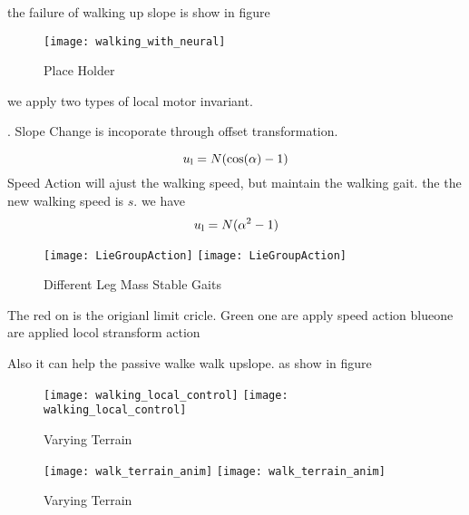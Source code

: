 the failure of walking up slope is show in figure

\begin{figure}[!htbp]
  \begin{center}
      \texttt{[image: walking\_with\_neural]}
    \caption{Place Holder}
    \label{fig:withoutlocalcontroller}
\end{center}
\end{figure}

we apply two types of local motor invariant.
\begin{itemize}

.
Slope Change is incoporate through offset transformation.

\[
u_{\mathrm{l}}=N(\mathrm{cos}(\alpha)-1)
\]
Speed Action will ajust the walking speed, but maintain the walking gait.
the the new walking speed is $s$.
we have
\[  
u_{\mathrm{l}}=N(\alpha^2-1)
\]
\end{itemize}

\begin{figure}[!htbp]
  \begin{center}
    \leavevmode
    \ifpdf
      \texttt{[image: LieGroupAction]}
    \else
      \texttt{[image: LieGroupAction]}
    \fi
    \caption{Different Leg Mass Stable Gaits}
    \label{fig:differentlr}
\end{center}
\end{figure}

The red on is the origianl limit cricle.
Green one are apply speed action
blueone are applied  locol stransform action

Also it can help the passive walke walk upslope.
as show in figure


\begin{figure}[!htbp]
  \begin{center}
    \leavevmode
    \ifpdf
      \texttt{[image: walking\_local\_control]}
    \else
      \texttt{[image: walking\_local\_control]}
    \fi
    \caption{Varying Terrain}
    \label{fig:diffterrain}
\end{center}
\end{figure}




\begin{figure}[!htbp]
  \begin{center}
    \leavevmode
    \ifpdf
      \texttt{[image: walk\_terrain\_anim]}
    \else
      \texttt{[image: walk\_terrain\_anim]}
    \fi
    \caption{Varying Terrain}
    \label{fig:diffterrain}
\end{center}
\end{figure}




